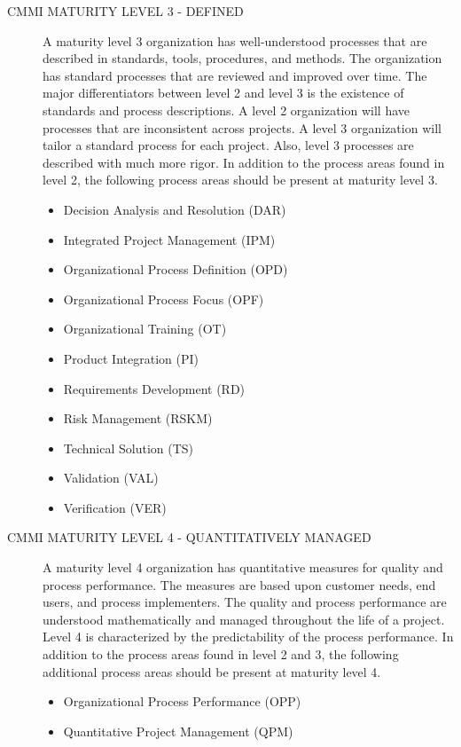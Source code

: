 \documentclass[SDSUThesis.tex]{subfiles}
\begin{document}
\begin{description}
        \item[CMMI MATURITY LEVEL 3 - DEFINED]
            A maturity level 3 organization has well-understood 
            processes that are described in 
            standards, tools, procedures, and methods.  The 
            organization has standard processes
            that are reviewed and improved over time.  The 
            major differentiators between level 2 
            and level 3 is the existence of standards and process descriptions. 
            A level 2 organization will have
            processes that are inconsistent across projects.  
            A level 3 organization will tailor
            a standard process for each project.  Also, 
            level 3 processes are described with 
            much more rigor.  In addition to the process areas found in level 2, 
            the following process areas should be present at maturity level 3.
            \begin{itemize}
                \item Decision Analysis and Resolution (DAR)
                \item Integrated Project Management (IPM)
                \item Organizational Process Definition (OPD)
                \item Organizational Process Focus (OPF)
                \item Organizational Training (OT)
                \item Product Integration (PI)
                \item Requirements Development (RD)
                \item Risk Management (RSKM)
                \item Technical Solution (TS)
                \item Validation (VAL)
                \item Verification (VER)
            \end{itemize}
            
        \item[CMMI MATURITY LEVEL 4 - QUANTITATIVELY MANAGED]
            A maturity level 4 organization has quantitative 
            measures for quality and process performance. 
            The measures are based upon customer needs, 
            end users, and process implementers.  
            The quality
            and process performance are understood mathematically and managed 
            throughout the life of a project.
            Level 4 is characterized by the predictability of the process performance. 
            In addition to
            the process areas found in level 2 and 3, the following additional 
            process areas should be present
            at maturity level 4.
            \begin{itemize}
                \item Organizational Process Performance (OPP)
                \item Quantitative Project Management (QPM)
            \end{itemize}
            

\end{description}
\end{document}

